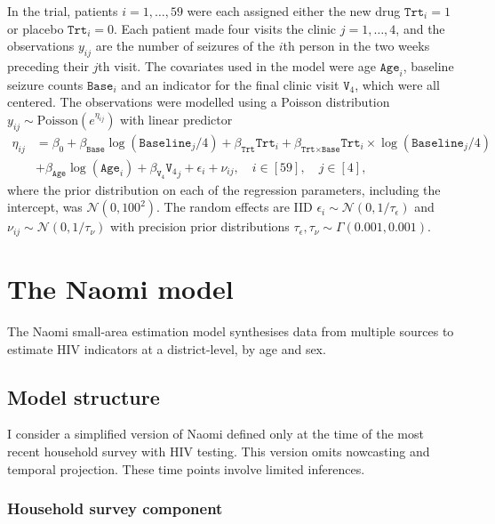 \documentclass[a4paper, nobind]{templates/ociamthesis}
\begin{document}
In the trial, patients \(i = 1, \ldots, 59\) were each assigned either the new drug \(\texttt{Trt}_i = 1\) or placebo \(\texttt{Trt}_i = 0\).
Each patient made four visits the clinic \(j = 1, \ldots, 4\), and the observations \(y_{ij}\) are the number of seizures of the \(i\)th person in the two weeks preceding their \(j\)th visit.
The covariates used in the model were age \(\texttt{Age}_i\), baseline seizure counts \(\texttt{Base}_i\) and an indicator for the final clinic visit \(\texttt{V}_4\), which were all centered.
The observations were modelled using a Poisson distribution \(y_{ij} \sim \text{Poisson}(e^{\eta_{ij}})\) with linear predictor
\begin{align*}
\eta_{ij}
&= \beta_0 + \beta_\texttt{Base} \log(\texttt{Baseline}_j / 4) + \beta_\texttt{Trt} \texttt{Trt}_i +
   \beta_{\texttt{Trt} \times \texttt{Base}} \texttt{Trt}_i \times \log(\texttt{Baseline}_j / 4) \\ 
&+ \beta_\texttt{Age} \log(\texttt{Age}_i) + \beta_{\texttt{V}_4} {\texttt{V}_4}_j +
   \epsilon_i + \nu_{ij}, \quad i \in [59], \quad j \in [4],
\end{align*}
where the prior distribution on each of the regression parameters, including the intercept, was \(\mathcal{N}(0, 100^2)\).
The random effects are IID \(\epsilon_i \sim \mathcal{N}(0, 1/\tau_\epsilon)\) and \(\nu_{ij} \sim \mathcal{N}(0, 1/\tau_\nu)\) with precision prior distributions \(\tau_\epsilon, \tau_\nu \sim \Gamma(0.001, 0.001)\).

\hypertarget{the-naomi-model}{%
\section{The Naomi model}\label{the-naomi-model}}

The Naomi small-area estimation model \autocite{eaton2021naomi} synthesises data from multiple sources to estimate HIV indicators at a district-level, by age and sex.

\hypertarget{model-structure}{%
\subsection{Model structure}\label{model-structure}}

I consider a simplified version of Naomi defined only at the time of the most recent household survey with HIV testing.
This version omits nowcasting and temporal projection.
These time points involve limited inferences.

\hypertarget{household-survey-component}{%
\subsubsection{\texorpdfstring{Household survey component \label{sec:household}}{Household survey component }}\label{household-survey-component}}
\end{document}
